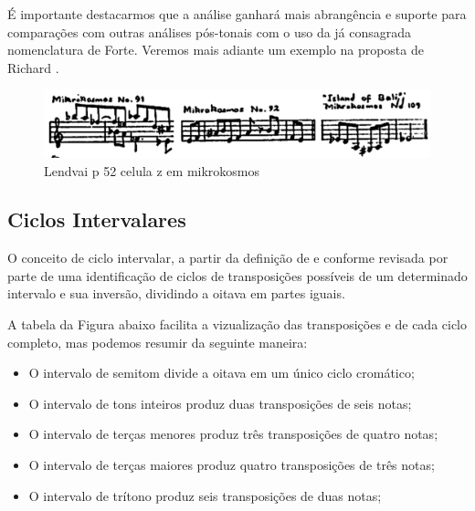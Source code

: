 \documentclass[
	12pt,				%
	openright,			%
	twoside,			%
	a4paper,			%
	english,			%
	french,				%
	spanish,			%
	brazil				%
	]{abntex2}
\begin{document}
É importante destacarmos que a análise ganhará mais abrangência e suporte para comparações com outras análises pós-tonais com o uso da já consagrada nomenclatura de Forte. Veremos mais adiante um exemplo na proposta de Richard . 


\begin{figure}[!h]
	\caption{\label{fig_grafico}Lendvai p 52 celula z em mikrokosmos }
	\begin{center}
	    \includegraphics[scale=0.4]{intervalar/Lendvai_p52_ZCell.png}
	\end{center}
\end{figure}

\pagebreak
\subsection{Ciclos Intervalares}

O conceito de ciclo intervalar, a partir da definição de  e conforme revisada por \cite[ p.22]{susanni_antokoletz2012music} parte de uma identificação de ciclos de transposições possíveis de um determinado intervalo e sua inversão, dividindo a oitava em partes iguais.

A tabela da Figura abaixo facilita a vizualização das transposições e de cada ciclo completo, mas podemos resumir da seguinte maneira: 

\begin{itemize}
\item O intervalo de semitom divide a oitava em um único ciclo cromático;
\item O intervalo de tons inteiros produz duas transposições de seis notas;
\item O intervalo de terças menores produz três transposições de quatro notas;
\item O intervalo de terças maiores produz quatro transposições de três notas;
\item O intervalo de trítono produz seis transposições de duas notas;
\end{itemize}
\end{document}
